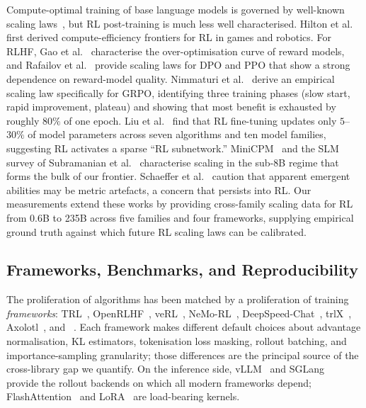 Compute-optimal training of base language models is governed by
well-known scaling laws~\cite{kaplan2020scalinglaws, hoffmann2022chinchilla,
muennighoff2023datascaling}, but RL post-training is much less well
characterised. Hilton et al.~\cite{hilton2023rlscaling} first derived
compute-efficiency frontiers for RL in games and robotics. For RLHF,
Gao et al.~\cite{gao2023reward} characterise the over-optimisation curve of
reward models, and Rafailov et al.~\cite{rafailov2024rlhfscaling} provide
scaling laws for DPO and PPO that show a strong dependence on reward-model
quality. Nimmaturi et al.~\cite{nimmaturi2025scalinglaws} derive an
empirical scaling law specifically for GRPO, identifying three training
phases (slow start, rapid improvement, plateau) and showing that most
benefit is exhausted by roughly $80\%$ of one epoch. Liu et
al.~\cite{liu2025rlsubnetworks} find that RL fine-tuning updates only
$5$--$30\%$ of model parameters across seven algorithms and ten model
families, suggesting RL activates a sparse ``RL subnetwork.''
MiniCPM~\cite{hu2024minicpm} and the SLM survey of
Subramanian et al.~\cite{subramanian2025slm} characterise scaling in the
sub-8B regime that forms the bulk of our frontier. Schaeffer et
al.~\cite{schaeffer2024emergent} caution that apparent emergent abilities may
be metric artefacts, a concern that persists into RL. Our measurements
extend these works by providing cross-family scaling data for RL from
0.6B to 235B across five families and four frameworks, supplying empirical
ground truth against which future RL scaling laws can be calibrated.

\subsection{Frameworks, Benchmarks, and Reproducibility}
\label{sec:related:frameworks}

The proliferation of algorithms has been matched by a proliferation of
training \emph{frameworks}: TRL~\cite{vonwerra2022trl},
OpenRLHF~\cite{hu2024openrlhf}, veRL~\cite{sheng2024verl},
NeMo-RL~\cite{nvidia2024nemorl}, DeepSpeed-Chat~\cite{yao2023deepspeedchat},
trlX~\cite{havrilla2023trlx}, Axolotl~\cite{axolotl2024}, and
\tinker{}~\cite{thinkingmachines2024tinker}. Each framework makes different
default choices about advantage normalisation, KL estimators, tokenisation
loss masking, rollout batching, and importance-sampling granularity; those
differences are the principal source of the cross-library gap we quantify.
On the inference side, vLLM~\cite{kwon2023vllm} and
SGLang~\cite{zheng2024sglang} provide the rollout backends on which all
modern frameworks depend; FlashAttention~\cite{dao2022flashattention} and
LoRA~\cite{hu2022lora} are load-bearing kernels.

